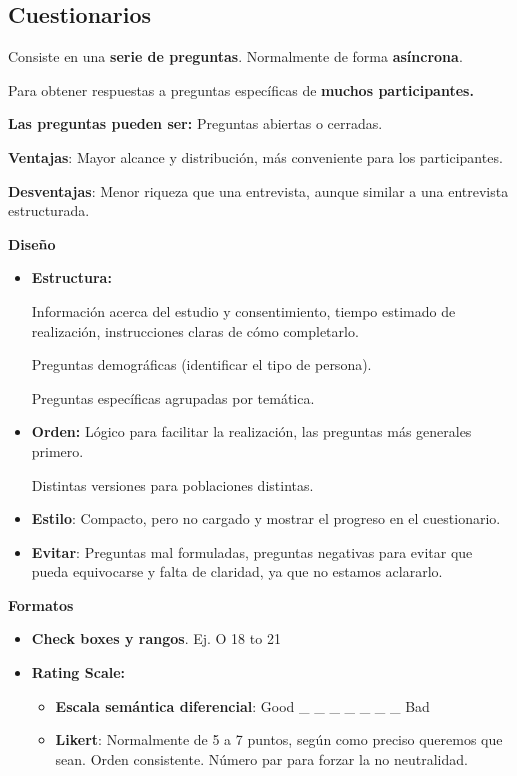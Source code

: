 \documentclass[12pt, twoside, openright]{report} %
\begin{document}
\subsection{Cuestionarios}

Consiste en una \textbf{serie de preguntas}. Normalmente de forma
\textbf{asíncrona}.

Para obtener respuestas a preguntas específicas de \textbf{muchos
participantes.}

\textbf{Las preguntas pueden ser:} Preguntas abiertas o cerradas.

\textbf{Ventajas}: Mayor alcance y distribución, más conveniente para
los participantes.

\textbf{Desventajas}: Menor riqueza que una entrevista, aunque similar a
una entrevista estructurada.

\textbf{Diseño}

\begin{itemize}
\item
  \textbf{Estructura:}

  Información acerca del estudio y consentimiento, tiempo estimado de
  realización, instrucciones claras de cómo completarlo.

  Preguntas demográficas (identificar el tipo de persona).

  Preguntas específicas agrupadas por temática.
\item
  \textbf{Orden:} Lógico para facilitar la realización, las preguntas
  más generales primero.

  Distintas versiones para poblaciones distintas.
\item
  \textbf{Estilo}: Compacto, pero no cargado y mostrar el progreso en el
  cuestionario.
\item
  \textbf{Evitar}: Preguntas mal formuladas, preguntas negativas para
  evitar que pueda equivocarse y falta de claridad, ya que no estamos
  aclararlo.
\end{itemize}

\textbf{Formatos}

\begin{itemize}
\item
  \textbf{Check boxes y rangos}. Ej. O 18 to 21
\item
  \textbf{Rating Scale:}

  \begin{itemize}
  
  \item
    \textbf{Escala semántica diferencial}: Good \_ \_ \_ \_ \_ \_ \_ Bad
    
    \item
      \textbf{Likert}: Normalmente de 5 a 7 puntos, según como preciso
      queremos que sean. Orden consistente. Número par para forzar la no
      neutralidad.
  \end{itemize}
\end{itemize}
\end{document}
